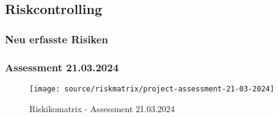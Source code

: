 
    \clearpage
    \recalctypearea
\begin{flushleft}
    \subsection{Riskcontrolling}
    \subsubsection{Neu erfasste Risiken}
    
        \subsubsection{Assessment 21.03.2024}
        
    \clearpage
    \recalctypearea
\end{flushleft}
\begin{flushleft}
    \begin{figure}[H]
        \centering
        \texttt{[image: source/riskmatrix/project-assessment-21-03-2024]}
        \caption{Riskikomatrix - Assessment 21.03.2024}
        \label{fig:project-assessment-21-03-2024}
    \end{figure}
\end{flushleft}